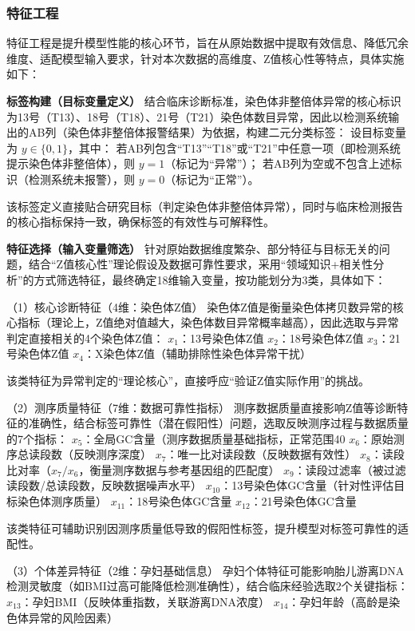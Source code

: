 \documentclass[withoutpreface,bwprint]{cumcmthesis} %
\begin{document}
\subsubsection{特征工程}
特征工程是提升模型性能的核心环节，旨在从原始数据中提取有效信息、降低冗余维度、适配模型输入要求，针对本次数据的高维度、Z值核心性等特点，具体实施如下：

\textbf{标签构建（目标变量定义）}
结合临床诊断标准，染色体非整倍体异常的核心标识为13号（T13）、18号（T18）、21号（T21）染色体数目异常，因此以检测系统输出的AB列（染色体非整倍体报警结果）为依据，构建二元分类标签：  
设目标变量为 $ y \in \{0,1\} $，其中：  
若AB列包含“T13”“T18”或“T21”中任意一项（即检测系统提示染色体非整倍体），则 $ y=1 $（标记为“异常”）；  
若AB列为空或不包含上述标识（检测系统未报警），则 $ y=0 $（标记为“正常”）。  

该标签定义直接贴合研究目标（判定染色体非整倍体异常），同时与临床检测报告的核心指标保持一致，确保标签的有效性与可解释性。

\textbf{特征选择（输入变量筛选）}
针对原始数据维度繁杂、部分特征与目标无关的问题，结合“Z值核心性”理论假设及数据可靠性要求，采用“领域知识+相关性分析”的方式筛选特征，最终确定18维输入变量，按功能划分为3类，具体如下：  

（1）核心诊断特征（4维：染色体Z值）  
染色体Z值是衡量染色体拷贝数异常的核心指标（理论上，Z值绝对值越大，染色体数目异常概率越高），因此选取与异常判定直接相关的4个染色体Z值：  
$ x_1 $：13号染色体Z值  
$ x_2 $：18号染色体Z值  
$ x_3 $：21号染色体Z值  
$ x_4 $：X染色体Z值（辅助排除性染色体异常干扰）  

该类特征为异常判定的“理论核心”，直接呼应“验证Z值实际作用”的挑战。

（2）测序质量特征（7维：数据可靠性指标）  
测序数据质量直接影响Z值等诊断特征的准确性，结合标签可靠性（潜在假阳性）问题，选取反映测序过程与数据质量的7个指标：  
$ x_5 $：全局GC含量（测序数据质量基础指标，正常范围40%
$ x_6 $：原始测序总读段数（反映测序深度）  
$ x_7 $：唯一比对读段数（反映数据有效性）  
$ x_8 $：读段比对率（$ x_7/x_6 $，衡量测序数据与参考基因组的匹配度）  
$ x_9 $：读段过滤率（被过滤读段数/总读段数，反映数据噪声水平）  
$ x_{10} $：13号染色体GC含量（针对性评估目标染色体测序质量）  
$ x_{11} $：18号染色体GC含量  
$ x_{12} $：21号染色体GC含量  

该类特征可辅助识别因测序质量低导致的假阳性标签，提升模型对标签可靠性的适配性。

（3）个体差异特征（2维：孕妇基础信息）  
孕妇个体特征可能影响胎儿游离DNA检测灵敏度（如BMI过高可能降低检测准确性），结合临床经验选取2个关键指标：  
$ x_{13} $：孕妇BMI（反映体重指数，关联游离DNA浓度）  
$ x_{14} $：孕妇年龄（高龄是染色体异常的风险因素）  
\end{document}
